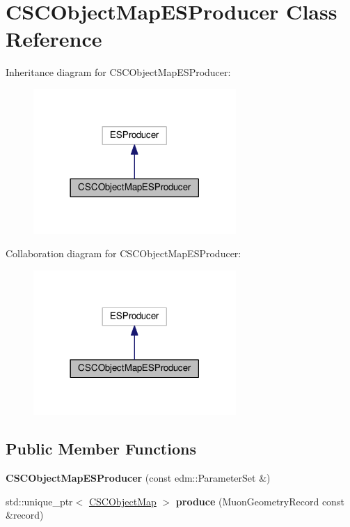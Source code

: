 \hypertarget{classCSCObjectMapESProducer}{\section{C\-S\-C\-Object\-Map\-E\-S\-Producer Class Reference}
\label{classCSCObjectMapESProducer}
}


Inheritance diagram for C\-S\-C\-Object\-Map\-E\-S\-Producer\-:\nopagebreak
\begin{figure}[H]
\begin{center}
\leavevmode
\includegraphics[width=218pt]{classCSCObjectMapESProducer__inherit__graph}
\end{center}
\end{figure}


Collaboration diagram for C\-S\-C\-Object\-Map\-E\-S\-Producer\-:\nopagebreak
\begin{figure}[H]
\begin{center}
\leavevmode
\includegraphics[width=218pt]{classCSCObjectMapESProducer__coll__graph}
\end{center}
\end{figure}
\subsection*{Public Member Functions}
\begin{DoxyCompactItemize}
\item 
\hypertarget{classCSCObjectMapESProducer_a70839fe6ad669166ad2540aa319e9c9c}{{\bfseries C\-S\-C\-Object\-Map\-E\-S\-Producer} (const edm\-::\-Parameter\-Set \&)}\label{classCSCObjectMapESProducer_a70839fe6ad669166ad2540aa319e9c9c}

\item 
\hypertarget{classCSCObjectMapESProducer_a6381047870aeef64579d92f34d69ba9c}{std\-::unique\-\_\-ptr$<$ \hyperlink{classCSCObjectMap}{C\-S\-C\-Object\-Map} $>$ {\bfseries produce} (Muon\-Geometry\-Record const \&record)}\label{classCSCObjectMapESProducer_a6381047870aeef64579d92f34d69ba9c}

\end{DoxyCompactItemize}
